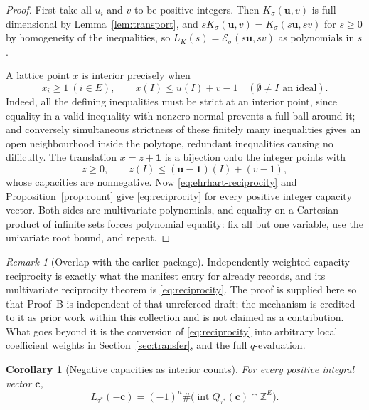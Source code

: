 \documentclass[11pt]{article}
\numberwithin{equation}{section}
\newtheorem{corollary}[theorem]{Corollary}
\theoremstyle{definition}
\theoremstyle{remark}
\newtheorem{remark}[theorem]{Remark}
\newcommand{\Z}{\mathbb Z}
\newcommand{\one}{\mathbf 1}
\newcommand{\Int}{\operatorname{int}}
\newcommand{\Ecal}{\mathcal E}
\begin{document}
\begin{proof}
First take all $u_i$ and $v$ to be positive integers. Then
$K_\sigma(\mathbf u,v)$ is full-dimensional by Lemma~\ref{lem:transport}, and
$sK_\sigma(\mathbf u,v)=K_\sigma(s\mathbf u,sv)$ for $s\ge0$ by homogeneity of
the inequalities, so $L_K(s)=\Ecal_\sigma(s\mathbf u,sv)$ as polynomials in
$s$.

A lattice point $x$ is interior precisely when
\[
 x_i\ge1\ (i\in E),\qquad x(I)\le u(I)+v-1\quad(\emptyset\ne I\text{ an ideal}).
\]
Indeed, all the defining inequalities must be strict at an interior point,
since equality in a valid inequality with nonzero normal prevents a full ball
around it; and conversely simultaneous strictness of these finitely many
inequalities gives an open neighbourhood inside the polytope, redundant
inequalities causing no difficulty. The translation $x=z+\one$ is a bijection
onto the integer points with
\[
 z\ge0,\qquad z(I)\le(\mathbf u-\one)(I)+(v-1),
\]
whose capacities are nonnegative. Now \eqref{eq:ehrhart-reciprocity} and
Proposition~\ref{prop:count} give \eqref{eq:reciprocity} for every positive
integer capacity vector. Both sides are multivariate polynomials, and equality
on a Cartesian product of infinite sets forces polynomial equality: fix all
but one variable, use the univariate root bound, and repeat.
\end{proof}

\begin{remark}[Overlap with the earlier package]
\label{rem:prior-reciprocity}
Independently weighted capacity reciprocity is exactly what the manifest
entry for \cite{PriorReciprocity} already records, and its multivariate
reciprocity theorem is \eqref{eq:reciprocity}. The proof is supplied here so
that Proof~B is independent of that unrefereed draft; the mechanism is
credited to it as prior work within this collection and is not claimed as a
contribution. What goes beyond it is the conversion of \eqref{eq:reciprocity}
into arbitrary local coefficient weights in Section~\ref{sec:transfer}, and
the full $q$-evaluation.
\end{remark}

\begin{corollary}[Negative capacities as interior counts]
\label{cor:L-reciprocity}
For every positive integral vector $\mathbf c$,
\begin{equation}
 L_{\tau^*}(-\mathbf c)
 =(-1)^n\#\bigl(\Int Q_{\tau^*}(\mathbf c)\cap\Z^E\bigr).
 \label{eq:L-reciprocity}
\end{equation}
\end{corollary}
\end{document}
